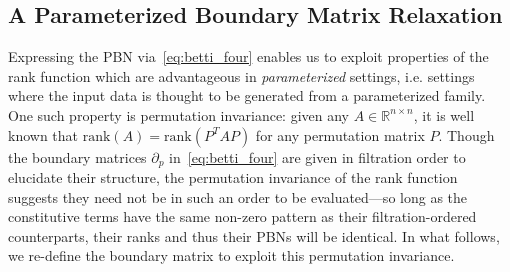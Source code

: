 \documentclass[10pt]{article}
\numberwithin{equation}{section}
\newcommand{\+}{%
	\raisebox{0.18ex}{\scaleobj{0.55}{+}}
}
\theoremstyle{definition}
\begin{document}
\subsection{A Parameterized Boundary Matrix Relaxation}
Expressing the PBN via~\eqref{eq:betti_four} enables us to exploit properties of the rank function which are advantageous in \emph{parameterized} settings, i.e. settings where the input data is  thought to be generated from a parameterized family.  
One such property is permutation invariance: given any $A \in \mathbb{R}^{n \times n}$, it is well known that $\mathrm{rank}(A) = \mathrm{rank}(P^T A P)$ for any permutation matrix $P$. Though  the boundary matrices $\partial_p$ in~\eqref{eq:betti_four} are given in filtration order to elucidate their structure, the permutation invariance of the rank function suggests they need not be in such an order to be evaluated---so long as the constitutive terms have the same non-zero pattern as their filtration-ordered counterparts, their ranks and thus their PBNs will be identical.
In what follows, we re-define the boundary matrix to exploit this permutation invariance. 
 
\end{document}
